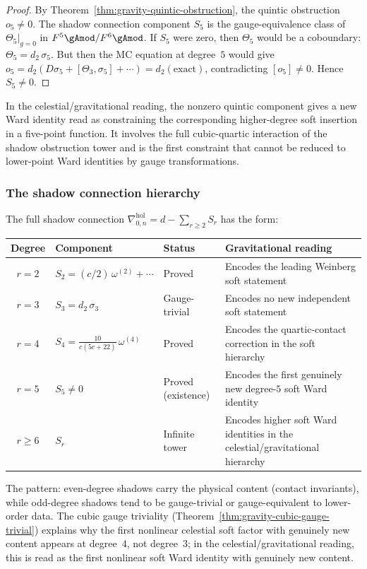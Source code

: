 \begin{proof}
By Theorem~\ref{thm:gravity-quintic-obstruction}, the quintic
obstruction $o_5 \ne 0$. The shadow connection component $S_5$ is
the gauge-equivalence class of $\Theta_5|_{g=0}$ in
$F^5\gAmod/F^6\gAmod$. If $S_5$ were zero, then $\Theta_5$ would
be a coboundary: $\Theta_5 = d_2\,\sigma_5$. But then the
MC equation at degree~$5$ would give $o_5 = d_2(D\sigma_5 +
[\Theta_3, \sigma_5] + \cdots) = d_2(\text{exact})$, contradicting
$[o_5] \ne 0$. Hence $S_5 \ne 0$.
\end{proof}

In the celestial/gravitational reading, the nonzero quintic component
gives a new Ward identity read as constraining the corresponding
higher-degree soft insertion in a five-point function. It involves the full cubic-quartic interaction
of the shadow obstruction tower and is the first constraint that cannot be
reduced to lower-point Ward identities by gauge transformations.

\subsubsection*{The shadow connection hierarchy}

The full shadow connection $\nabla^{\mathrm{hol}}_{0,n}
= d - \sum_{r \ge 2} S_r$ has the form:
\begin{center}
\small
\renewcommand{\arraystretch}{1.2}
\begin{tabular}{clll}
\textbf{Degree} & \textbf{Component}
 & \textbf{Status} & \textbf{Gravitational reading} \\
\hline
$r = 2$ & $S_2 = (c/2)\,\omega^{(2)} + \cdots$
 & Proved & Encodes the leading Weinberg soft statement \\[2pt]
$r = 3$ & $S_3 = d_2\,\sigma_3$
 & Gauge-trivial & Encodes no new independent soft statement \\[2pt]
$r = 4$ & $S_4 = \frac{10}{c(5c+22)}\,\omega^{(4)}$
 & Proved & Encodes the quartic-contact correction in the soft hierarchy \\[2pt]
$r = 5$ & $S_5 \ne 0$
 & Proved (existence) & Encodes the first genuinely new degree-$5$ soft Ward identity \\[2pt]
$r \ge 6$ & $S_r$
 & Infinite tower & Encodes higher soft Ward identities in the celestial/gravitational hierarchy
\end{tabular}
\end{center}

\noindent
The pattern: even-degree shadows carry the physical content (contact
invariants), while odd-degree shadows tend to be gauge-trivial or
gauge-equivalent to lower-order data. The cubic gauge triviality
(Theorem~\ref{thm:gravity-cubic-gauge-trivial}) explains why the
first nonlinear celestial soft factor with genuinely new content
appears at degree~$4$, not degree~$3$; in the
celestial/gravitational reading, this is read as the first nonlinear
soft Ward identity with genuinely new content.

